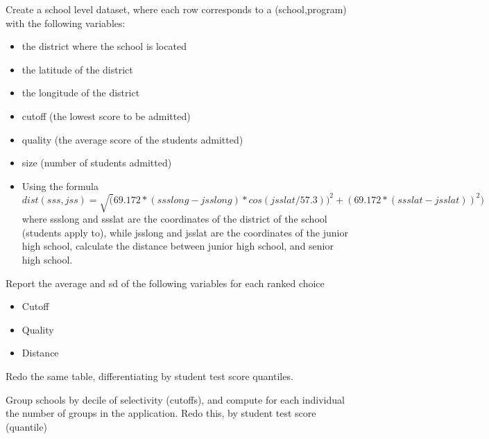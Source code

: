 \documentclass[10pt,a4paper]{article}
\newcommand{\1}{\mathds{1}}
\begin{document}
\begin{Exercise}[title=Data]
Create a school level dataset, where each row corresponds to a (school,program) with the following variables:
\begin{itemize}
\item the district where the school is located
\item the latitude of the district
\item the longitude of the district
\item cutoff (the lowest score to be admitted)
\item quality (the average score of the students admitted)
\item size (number of students admitted)
\end{itemize}
\end{Exercise}


\begin{Exercise}[title=Distance]
\begin{itemize}
\item Using the formula
\begin{equation*}
dist(sss,jss) = \sqrt(69.172*(ssslong-jsslong)*cos(jsslat/57.3))^2+(69.172*(ssslat-jsslat))^2)
\end{equation*}
where ssslong and ssslat are the coordinates of the district of the school (students apply to), while jsslong and jsslat are the coordinates of the junior high school, calculate the distance between junior high school, and senior high school.
\end{itemize}
\end{Exercise}

\begin{Exercise}[title=Descriptive Characteristics]
Report the average and sd of the following variables for each ranked choice 
\begin{itemize}
\item Cutoff
\item Quality
\item Distance
\end{itemize}
Redo the same table, differentiating by student test score quantiles.
\end{Exercise}


\begin{Exercise}[title=Diversification]
Group schools by decile of selectivity (cutoffs), and compute for each individual the number of groups in the application. Redo this, by student test score (quantile)
\end{Exercise}
\end{document}
